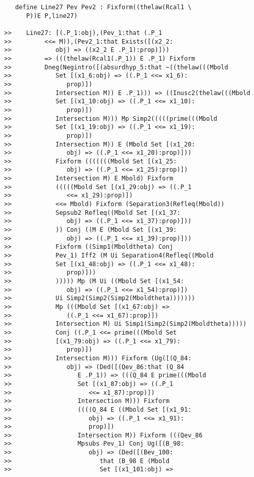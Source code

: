 \documentclass[12pt]{article}
\begin{document}
\begin{verbatim}
   define Line27 Pev Pev2 : Fixform((thelaw(Rcal1 \
      P))E P,line27)

>>    Line27: [(.P_1:obj),(Pev_1:that (.P_1
>>         <<= M)),(Pev2_1:that Exists([(x2_2:
>>            obj) => ((x2_2 E .P_1):prop)]))
>>         => (((thelaw(Rcal1(.P_1)) E .P_1) Fixform
>>         Dneg(Negintro([(absurdhyp_5:that ~((thelaw(((Mbold
>>            Set [(x1_6:obj) => ((.P_1 <<= x1_6):
>>               prop)])
>>            Intersection M)) E .P_1))) => ((Inusc2(thelaw(((Mbold
>>            Set [(x1_10:obj) => ((.P_1 <<= x1_10):
>>               prop)])
>>            Intersection M))) Mp Simp2(((((prime(((Mbold
>>            Set [(x1_19:obj) => ((.P_1 <<= x1_19):
>>               prop)])
>>            Intersection M)) E (Mbold Set [(x1_20:
>>               obj) => ((.P_1 <<= x1_20):prop)]))
>>            Fixform (((((((Mbold Set [(x1_25:
>>               obj) => ((.P_1 <<= x1_25):prop)])
>>            Intersection M) E Mbold) Fixform
>>            (((((Mbold Set [(x1_29:obj) => ((.P_1
>>               <<= x1_29):prop)])
>>            <<= Mbold) Fixform (Separation3(Refleq(Mbold))
>>            Sepsub2 Refleq((Mbold Set [(x1_37:
>>               obj) => ((.P_1 <<= x1_37):prop)]))
>>            )) Conj ((M E (Mbold Set [(x1_39:
>>               obj) => ((.P_1 <<= x1_39):prop)]))
>>            Fixform ((Simp1(Mboldtheta) Conj
>>            Pev_1) Iff2 (M Ui Separation4(Refleq((Mbold
>>            Set [(x1_48:obj) => ((.P_1 <<= x1_48):
>>               prop)]))
>>            ))))) Mp (M Ui ((Mbold Set [(x1_54:
>>               obj) => ((.P_1 <<= x1_54):prop)])
>>            Ui Simp2(Simp2(Simp2(Mboldtheta)))))))
>>            Mp (((Mbold Set [(x1_67:obj) =>
>>               ((.P_1 <<= x1_67):prop)])
>>            Intersection M) Ui Simp1(Simp2(Simp2(Mboldtheta)))))
>>            Conj ((.P_1 <<= prime(((Mbold Set
>>            [(x1_79:obj) => ((.P_1 <<= x1_79):
>>               prop)])
>>            Intersection M))) Fixform (Ug([(Q_84:
>>               obj) => (Ded([(Qev_86:that (Q_84
>>                  E .P_1)) => (((Q_84 E prime(((Mbold
>>                  Set [(x1_87:obj) => ((.P_1
>>                     <<= x1_87):prop)])
>>                  Intersection M))) Fixform
>>                  ((((Q_84 E ((Mbold Set [(x1_91:
>>                     obj) => ((.P_1 <<= x1_91):
>>                     prop)])
>>                  Intersection M)) Fixform (((Qev_86
>>                  Mpsubs Pev_1) Conj Ug([(B_98:
>>                     obj) => (Ded([(Bev_100:
>>                        that (B_98 E (Mbold
>>                        Set [(x1_101:obj) =>

\end{verbatim}
\end{document}

